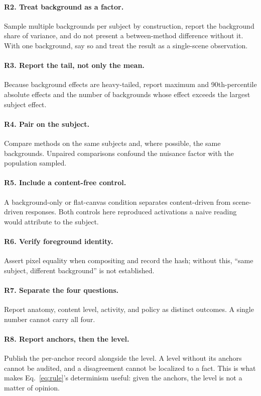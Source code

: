 \documentclass[11pt]{article}
\begin{document}
\paragraph{R2. Treat background as a factor.} Sample multiple backgrounds per subject by construction, report the background share of variance, and do not present a between-method difference without it. With one background, say so and treat the result as a single-scene observation.

\paragraph{R3. Report the tail, not only the mean.} Because background effects are heavy-tailed, report maximum and 90th-percentile absolute effects and the number of backgrounds whose effect exceeds the largest subject effect.

\paragraph{R4. Pair on the subject.} Compare methods on the same subjects and, where possible, the same backgrounds. Unpaired comparisons confound the nuisance factor with the population sampled.

\paragraph{R5. Include a content-free control.} A background-only or flat-canvas condition separates content-driven from scene-driven responses. Both controls here reproduced activations a naive reading would attribute to the subject.

\paragraph{R6. Verify foreground identity.} Assert pixel equality when compositing and record the hash; without this, ``same subject, different background'' is not established.

\paragraph{R7. Separate the four questions.} Report anatomy, content level, activity, and policy as distinct outcomes. A single number cannot carry all four.

\paragraph{R8. Report anchors, then the level.} Publish the per-anchor record alongside the level. A level without its anchors cannot be audited, and a disagreement cannot be localized to a fact. This is what makes Eq.~\ref{eq:rule}'s determinism useful: given the anchors, the level is not a matter of opinion.
\end{document}
